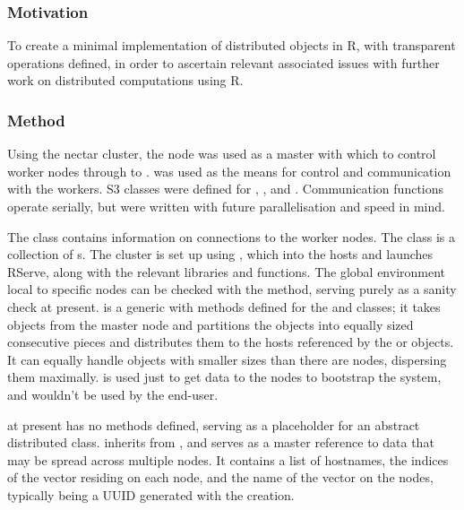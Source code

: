 \subsubsection{Motivation}\label{sec:ds-motivation}

To create a minimal implementation of distributed objects in R, with
transparent operations defined, in order to ascertain relevant
associated issues with further work on distributed computations using R.

\subsubsection{Method}\label{method}

Using the nectar cluster, the  node was used as a master
with which to control worker nodes  through to
.  was used as the means for control and
communication with the workers. S3 classes were defined for
, ,  and
. Communication functions operate serially,
but were written with future parallelisation and speed in mind.

The  class contains information on connections to the
worker nodes. The  class is a collection of
s. The cluster is set up using ,
which  into the hosts and launches RServe, along with the
relevant libraries and functions. The global environment local to
specific nodes can be checked with the  method, serving
purely as a sanity check at present.  is a generic with
methods defined for the  and  classes; it
takes objects from the master node and partitions the objects into
equally sized consecutive pieces and distributes them to the hosts
referenced by the  or  objects. It can
equally handle objects with smaller  sizes than there are
nodes, dispersing them maximally.  is used just to get
data to the nodes to bootstrap the system, and wouldn't be used by the
end-user.

 at present has no methods defined, serving
as a placeholder for an abstract distributed class.
 inherits from ,
and serves as a master reference to data that may be spread across
multiple nodes. It contains a list of hostnames, the indices of the
vector residing on each node, and the name of the vector on the nodes,
typically being a UUID generated with the 
creation.

